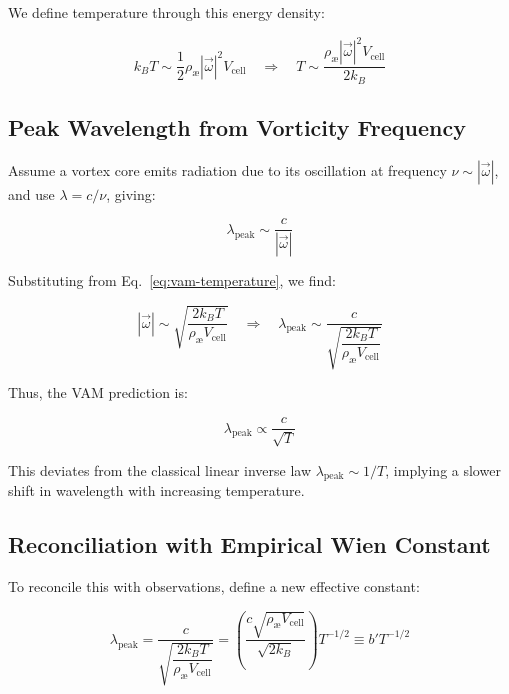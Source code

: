 \documentclass[12pt]{article}
\begin{document}
We define temperature through this energy density:

\begin{equation}
k_B T \sim \frac{1}{2} \rho_\text{\ae} |\vec{\omega}|^2 V_{\text{cell}}
\quad \Rightarrow \quad
T \sim \frac{\rho_\text{\ae} |\vec{\omega}|^2 V_{\text{cell}}}{2 k_B}
\label{eq:vam-temperature}
\end{equation}

\subsection{Peak Wavelength from Vorticity Frequency}

Assume a vortex core emits radiation due to its oscillation at frequency \( \nu \sim |\vec{\omega}| \), and use \( \lambda = c/\nu \), giving:

\begin{equation}
\lambda_{\text{peak}} \sim \frac{c}{|\vec{\omega}|}
\end{equation}

Substituting from Eq.~\eqref{eq:vam-temperature}, we find:

\begin{equation}
|\vec{\omega}| \sim \sqrt{ \frac{2 k_B T}{\rho_\text{\ae} V_{\text{cell}}} }
\quad \Rightarrow \quad
\boxed{
\lambda_{\text{peak}} \sim \frac{c}{\sqrt{ \dfrac{2 k_B T}{\rho_\text{\ae} V_{\text{cell}}} }}
}
\label{eq:vam-lambda}
\end{equation}

Thus, the VAM prediction is:

\begin{equation}
\boxed{
\lambda_{\text{peak}} \propto \frac{c}{\sqrt{T}}
}
\end{equation}

This deviates from the classical linear inverse law \( \lambda_{\text{peak}} \sim 1/T \), implying a slower shift in wavelength with increasing temperature.

\subsection{Reconciliation with Empirical Wien Constant}

To reconcile this with observations, define a new effective constant:

\begin{equation}
\lambda_{\text{peak}} = \frac{c}{\sqrt{ \dfrac{2 k_B T}{\rho_\text{\ae} V_{\text{cell}}} }} 
= \left( \frac{c \sqrt{\rho_\text{\ae} V_{\text{cell}}}}{\sqrt{2 k_B}} \right) T^{-1/2}
\equiv b' T^{-1/2}
\end{equation}
\end{document}
